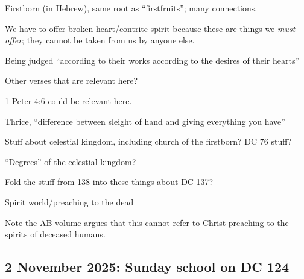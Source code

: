 \begin{compactitem}
\begin{compactitem}
					\item Firstborn (in Hebrew), same root as ``firstfruits''; many connections. 
					\item We have to offer broken heart/contrite spirit because these are things we \textit{must offer}; they cannot be taken from us by anyone else.
					\item Being judged ``according to their works according to the desires of their hearts''
						\begin{compactitem}
							\item Other verses that are relevant here?
							\item \hyperref[1PETER-4-6]{1 Peter 4:6} could be relevant here.
						\end{compactitem}
					\item Thrice, ``difference between sleight of hand and giving everything you have''
				\end{compactitem}
				
			\item Stuff about celestial kingdom, including church of the firstborn? DC 76 stuff? 
				\begin{compactitem}
					\item ``Degrees'' of the celestial kingdom?
				\end{compactitem}
				
			\item Fold the stuff from 138 into these things about DC 137?	

			\item Spirit world/preaching to the dead
				\begin{compactitem}
					\item Note the AB volume argues that this cannot refer to Christ preaching to the spirits of deceased humans. 
				\end{compactitem}
		
		\end{compactitem} 
	
	\subsection{2 November 2025: Sunday school on DC 124}
		\label{TALKS-02-11-2025}
		
